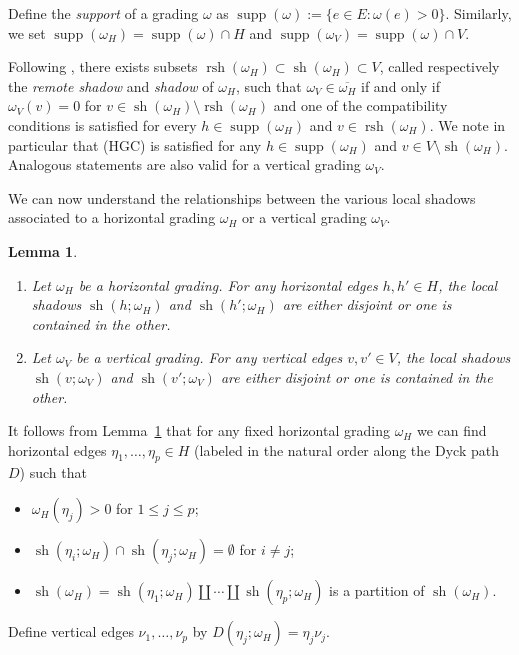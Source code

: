 \documentclass{amsart}
\newtheorem{lemma}[theorem]{Lemma}
\newcommand{\supp}{\operatorname{supp}}
\newcommand{\rsh}{\operatorname{rsh}}
\newcommand{\sh}{\operatorname{sh}}
\newenvironment{enumeratea}{\begin{enumerate}[\upshape (a)]}
                           {\end{enumerate}}
\begin{document}
Define the \emph{support} of a grading $\omega$ as $\supp(\omega):=\{e\in E:\omega(e)>0\}$.  Similarly, we set $\supp(\omega_H)=\supp(\omega)\cap H$ and $\supp(\omega_V)=\supp(\omega)\cap V$. 

Following \cite[Lemma 4.4]{rupel2}, there exists subsets $\rsh(\omega_H)\subset\sh(\omega_H)\subset V$, called respectively the \emph{remote shadow} and \emph{shadow} of $\omega_H$, such that $\omega_V\in\overline{\omega_H}$ if and only if $\omega_V(v)=0$ for $v\in\sh(\omega_H)\setminus\rsh(\omega_H)$ and one of the compatibility conditions is satisfied for every $h\in\supp(\omega_H)$ and $v\in\rsh(\omega_H)$.  We note in particular that (HGC) is satisfied for any $h\in\supp(\omega_H)$ and $v\in V\setminus\sh(\omega_H)$.  Analogous statements are also valid for a vertical grading $\omega_V$.

















 

 We can now understand the relationships between the various local shadows associated to a horizontal grading $\omega_H$ or a vertical grading $\omega_V$.
 \begin{lemma}\label{le:shadow containment}\mbox{}
  \begin{enumeratea}
   \item Let $\omega_H$ be a horizontal grading.  For any horizontal edges $h,h'\in H$, the local shadows $\sh(h;\omega_H)$ and $\sh(h';\omega_H)$ are either disjoint or one is contained in the other.
   \item Let $\omega_V$ be a vertical grading.  For any vertical edges $v,v'\in V$, the local shadows $\sh(v;\omega_V)$ and $\sh(v';\omega_V)$ are either disjoint or one is contained in the other.
  \end{enumeratea}
 \end{lemma}
 
 It follows from Lemma~\ref{le:shadow containment} that for any fixed horizontal grading $\omega_H$ we can find horizontal edges $\eta_1,\ldots,\eta_p\in H$ (labeled in the natural order along the Dyck path $D$) such that
 \begin{itemize}
  \item $\omega_H(\eta_j)>0$ for $1\le j\le p$;
  \item $\sh(\eta_i;\omega_H)\cap\sh(\eta_j;\omega_H)=\emptyset$ for $i\ne j$;
  \item $\sh(\omega_H)=\sh(\eta_1;\omega_H)\amalg\cdots\amalg\sh(\eta_p;\omega_H)$ is a partition of $\sh(\omega_H)$.
 \end{itemize}
 Define vertical edges $\nu_1,\ldots,\nu_p$ by $D(\eta_j;\omega_H)=\eta_j\nu_j$.
   
\end{document}
